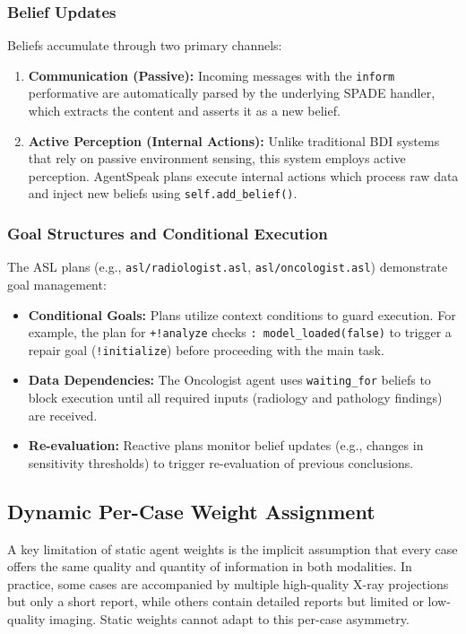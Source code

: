 \documentclass[12pt]{article}
\begin{document}
\subsubsection{Belief Updates}
Beliefs accumulate through two primary channels:
\begin{enumerate}
    \item \textbf{Communication (Passive):} Incoming messages with the \texttt{inform} performative are automatically parsed by the underlying SPADE handler, which extracts the content and asserts it as a new belief.
    \item \textbf{Active Perception (Internal Actions):} Unlike traditional BDI systems that rely on passive environment sensing, this system employs active perception. AgentSpeak plans execute internal actions which process raw data and inject new beliefs using \texttt{self.add\_belief()}.
\end{enumerate}

\subsubsection{Goal Structures and Conditional Execution}
The ASL plans (e.g., \texttt{asl/radiologist.asl}, \texttt{asl/oncologist.asl}) demonstrate goal management:
\begin{itemize}
    \item \textbf{Conditional Goals:} Plans utilize context conditions to guard execution. For example, the plan for \texttt{+!analyze} checks \texttt{: model\_loaded(false)} to trigger a repair goal (\texttt{!initialize}) before proceeding with the main task.
    \item \textbf{Data Dependencies:} The Oncologist agent uses \texttt{waiting\_for} beliefs to block execution until all required inputs (radiology and pathology findings) are received.
    \item \textbf{Re-evaluation:} Reactive plans monitor belief updates (e.g., changes in sensitivity thresholds) to trigger re-evaluation of previous conclusions.
\end{itemize}

\subsection{Dynamic Per-Case Weight Assignment}
\label{subsec:dynamic-weights}

A key limitation of static agent weights is the implicit assumption that every case offers the same quality and quantity of information in both modalities. In practice, some cases are accompanied by multiple high-quality X-ray projections but only a short report, while others contain detailed reports but limited or low-quality imaging. Static weights cannot adapt to this per-case asymmetry.
\end{document}
